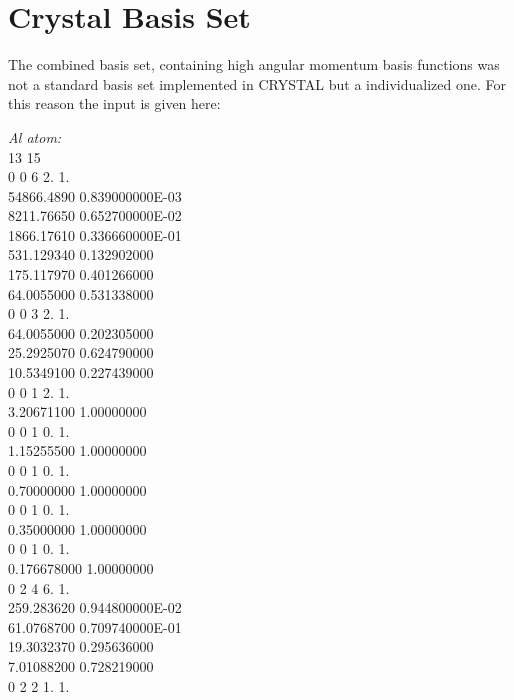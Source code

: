 \documentclass[11pt,DIV=13,BCOR=5mm,a4paper,headinclude]{scrbook}
\begin{document}
\def\thefigure{E.\arabic{figure}}
\def\thetable{E.\arabic{table}}
\section{Crystal Basis Set}\label{app_combined_basis}
The combined basis set, containing high angular momentum basis functions was not a standard basis set implemented in CRYSTAL but a individualized one. For this reason the input is given here:
\\
\begin{spacing}{0.5}
{\tiny \textit{Al atom:}\\
13 15\\
0 0 6 2. 1.\\
       54866.4890         0.839000000E-03\\
       8211.76650         0.652700000E-02\\
       1866.17610         0.336660000E-01\\
       531.129340         0.132902000\\
       175.117970         0.401266000\\
       64.0055000         0.531338000\\
0 0 3 2. 1.\\
       64.0055000         0.202305000\\
       25.2925070         0.624790000\\
       10.5349100         0.227439000\\
0 0 1 2. 1.\\
       3.20671100          1.00000000\\
0 0 1 0. 1.\\
       1.15255500          1.00000000\\
0 0 1 0. 1.\\
       0.70000000          1.00000000\\
0 0 1 0. 1.\\
       0.35000000          1.00000000\\
0 0 1 0. 1.\\
      0.176678000          1.00000000\\
0 2 4 6. 1.\\
       259.283620         0.944800000E-02\\
       61.0768700         0.709740000E-01\\
       19.3032370         0.295636000\\
       7.01088200         0.728219000\\
0 2 2 1. 1.\\
}
\end{spacing}
\end{document}
